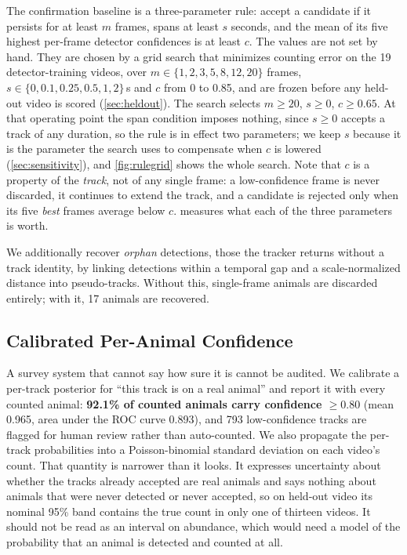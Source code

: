 The confirmation baseline is a three-parameter rule: accept a candidate if it persists for
at least $m$ frames, spans at least $s$ seconds, and the mean of its five highest per-frame
detector confidences is at least $c$. The values are not set by hand. They are chosen by a
grid search that minimizes counting error on the 19 detector-training videos, over
$m\in\{1,2,3,5,8,12,20\}$ frames, $s\in\{0,0.1,0.25,0.5,1,2\}$\,s and $c$ from 0 to 0.85,
and are frozen before any held-out video is scored (\cref{sec:heldout}). The search selects
$m\ge20$, $s\ge0$, $c\ge0.65$. At that operating point the span condition imposes nothing,
since $s\ge0$ accepts a track of any duration, so the rule is in effect two parameters; we keep
$s$ because it is the parameter the search uses to compensate when $c$ is lowered
(\cref{sec:sensitivity}), and \cref{fig:rulegrid} shows the whole search. Note that $c$ is a property of the
\emph{track}, not of any single frame: a low-confidence frame is never discarded, it
continues to extend the track, and a candidate is rejected only when its five \emph{best}
frames average below $c$.  measures what each of the three
parameters is worth.

We additionally recover \emph{orphan} detections, those the tracker returns without a
track identity, by linking detections within a temporal gap and a scale-normalized
distance into pseudo-tracks. Without this, single-frame animals are discarded entirely; with
it, 17 animals are recovered.

\subsection{Calibrated Per-Animal Confidence}
\label{sec:calibration}

A survey system that cannot say how sure it is cannot be audited. We calibrate a per-track
posterior for ``this track is on a real animal'' and report it with every counted animal:
\textbf{92.1\% of counted animals carry confidence $\ge0.80$} (mean 0.965, area under the ROC curve 0.893), and
793 low-confidence tracks are flagged for human review rather than auto-counted. We also propagate the per-track probabilities into a Poisson-binomial standard deviation on
each video's count. That quantity is narrower than it looks. It expresses uncertainty about
whether the tracks already accepted are real animals and says nothing about animals that
were never detected or never accepted, so on held-out video its nominal 95\% band contains the
true count in only one of thirteen videos. It should not be read as an interval on abundance,
which would need a model of the probability that an animal is detected and counted at all.

